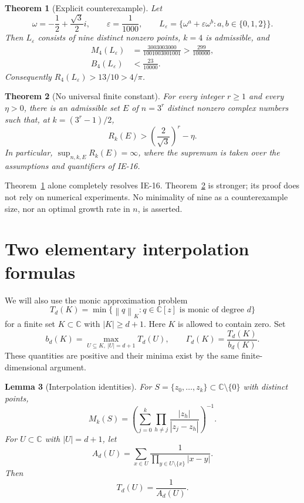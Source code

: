 \documentclass[11pt,a4paper]{article}
\newtheorem{theorem}{Theorem}[section]
\newtheorem{lemma}[theorem]{Lemma}
\theoremstyle{remark}
\newcommand{\C}{\mathbb C}
\newcommand{\norm}[1]{\left\lVert#1\right\rVert}
\newcommand{\eps}{\varepsilon}
\newcommand{\om}{\omega}
\begin{document}
\begin{theorem}[Explicit counterexample]\label{thm:finite}
Let
\[
 \om=-\frac12+\frac{\sqrt3}{2}i,\qquad \eps=\frac1{1000},\qquad
 L_\eps=\{\om^a+\eps\om^b: a,b\in\{0,1,2\}\}.
\]
Then $L_\eps$ consists of nine distinct nonzero points, $k=4$ is admissible,
and
\begin{align}
 M_4(L_\eps)
 &=\frac{3003003000}{1001003001001}>\frac{299}{100000},\label{eq:M-exact-number}\\
 B_4(L_\eps)&<\frac{23}{10000}.\label{eq:B-bound-number}
\end{align}
Consequently $R_4(L_\eps)>13/10>4/\pi$.
\end{theorem}

\begin{theorem}[No universal finite constant]\label{thm:unbounded}
For every integer $r\ge1$ and every $\eta>0$, there is an admissible set $E$
of $n=3^r$ distinct nonzero complex numbers such that, at
$k=(3^r-1)/2$,
\[
 R_k(E)>\left(\frac2{\sqrt3}\right)^r-\eta.
\]
In particular, $\sup_{n,k,E}R_k(E)=\infty$, where the supremum is taken over
the assumptions and quantifiers of IE-16.
\end{theorem}

Theorem~\ref{thm:finite} alone completely resolves IE-16. Theorem~\ref{thm:unbounded}
is stronger; its proof does not rely on numerical experiments.
No minimality of nine as a counterexample size, nor an optimal growth rate in
$n$, is asserted.

\section{Two elementary interpolation formulas}
We will also use the monic approximation problem
\[
 T_d(K)=\min\{\norm{q}_K:q\in\C[z]\text{ is monic of degree }d\}
\]
for a finite set $K\subset\C$ with $|K|\ge d+1$. Here $K$ is allowed to contain
zero. Set
\[
 b_d(K)=\max_{U\subseteq K,\ |U|=d+1}T_d(U),
 \qquad \Gamma_d(K)=\frac{T_d(K)}{b_d(K)}.
\]
These quantities are positive and their minima exist by the same
finite-dimensional argument.

\begin{lemma}[Interpolation identities]\label{lem:interpolation}
For $S=\{z_0,\ldots,z_k\}\subset\C\setminus\{0\}$ with distinct points,
\begin{equation}\label{eq:lagrange-residual}
 M_k(S)=\left(\sum_{j=0}^k
 \prod_{h\ne j}\frac{|z_h|}{|z_j-z_h|}\right)^{-1}.
\end{equation}
For $U\subset\C$ with $|U|=d+1$, let
\[
 A_d(U)=\sum_{x\in U}\frac1{\prod_{y\in U\setminus\{x\}}|x-y|}.
\]
Then
\begin{equation}\label{eq:lagrange-monic}
 T_d(U)=\frac1{A_d(U)}.
\end{equation}
\end{lemma}
\end{document}

